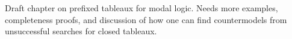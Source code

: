 \documentclass[../../../include/open-logic-chapter]{subfiles}
\begin{document}

\begin{editorial}
  Draft chapter on prefixed tableaux for modal logic. Needs more
  examples, completeness proofs, and discussion of how one can find
  countermodels from unsuccessful searches for closed tableaux.
\end{editorial}


\OLEndChapterHook
\end{document}

